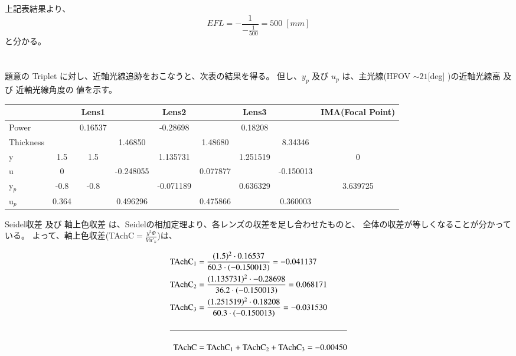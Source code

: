 \documentclass[a4paper,10pt]{jsarticle}
\begin{document}
\vspace{1\baselineskip}

上記表結果より、
\begin{equation*}
EFL = -\frac{1}{-\frac{1}{500}} = 500 \; [mm]
\end{equation*}
と分かる。

\newpage





\section{}
題意の Triplet に対し、近軸光線追跡をおこなうと、次表の結果を得る。
但し、$y_p$ 及び $u_p$ は、主光線(HFOV $ \sim 21$[deg] )の近軸光線高 及び 近軸光線角度の
値を示す。

\vspace{1\baselineskip}
\begin{center}
\begin{tabular}{l|cccccccc}
	& & Lens1 & & Lens2 & & Lens3 & & IMA(Focal Point) \\ \hline
Power & & 0.16537 & & -0.28698 & & 0.18208 & & \\
Thickness & & & 1.46850 & & 1.48680 & & 8.34346 & \\ \hline
y & 1.5 & 1.5 & & 1.135731 & & 1.251519 & & 0 \\
u & 0 & & -0.248055 & & 0.077877 & & -0.150013 & \\ \hline
y$_p$ & -0.8 & -0.8 & & -0.071189 & & 0.636329 & & 3.639725 \\
u$_p$ & 0.364 & & 0.496296 & & 0.475866 & & 0.360003 & \\ \hline
\end{tabular}
\end{center}
\vspace{1\baselineskip}

Seidel収差 及び 軸上色収差 は、Seidelの相加定理より、各レンズの収差を足し合わせたものと、
全体の収差が等しくなることが分かっている。
よって、軸上色収差(TAchC$= \frac{y^2 \Phi}{V u'_k} $)は、

\begin{center}
\begin{align*}
\mathrm{TAchC}_1 &= \frac{(1.5)^2 \cdot 0.16537}{60.3 \cdot (-0.150013)} = -0.041137 \\
\mathrm{TAchC}_2 &= \frac{(1.135731)^2 \cdot -0.28698}{36.2 \cdot (-0.150013)} = 0.068171 \\
\mathrm{TAchC}_3 &= \frac{(1.251519)^2 \cdot 0.18208}{60.3 \cdot (-0.150013)} = -0.031530 \\
\\ \hline
\\
\mathrm{TAchC} &= \mathrm{TAchC}_1 + \mathrm{TAchC}_2 + \mathrm{TAchC}_3 = -0.00450
\end{align*}
\end{center}
\end{document}
